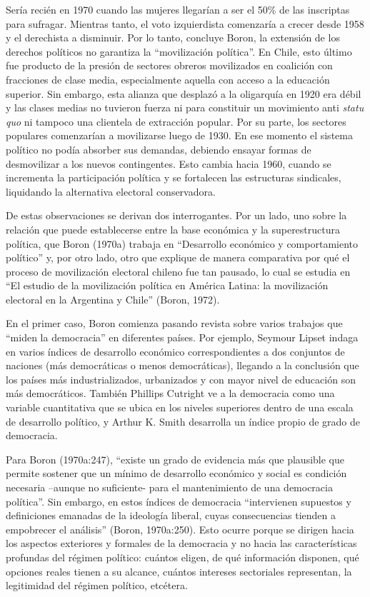Sería recién en 1970 cuando las mujeres llegarían a ser el 50\% de las inscriptas para sufragar. Mientras tanto, el voto izquierdista comenzaría a crecer desde 1958 y el derechista a disminuir. Por lo tanto, concluye Boron, la extensión de los derechos políticos no garantiza la \enquote{movilización política}. En Chile, esto último fue producto de la presión de sectores obreros movilizados en coalición con fracciones de clase media, especialmente aquella con acceso a la educación superior. Sin embargo, esta alianza que desplazó a la oligarquía en 1920 era débil y las clases medias no tuvieron fuerza ni para constituir un movimiento anti \emph{statu quo} ni tampoco una clientela de extracción popular. Por su parte, los sectores populares comenzarían a movilizarse luego de 1930. En ese momento el sistema político no podía absorber sus demandas, debiendo ensayar formas de desmovilizar a los nuevos contingentes. Esto cambia hacia 1960, cuando se incrementa la participación política y se fortalecen las estructuras sindicales, liquidando la alternativa electoral conservadora.

De estas observaciones se derivan dos interrogantes. Por un lado, uno sobre la relación que puede establecerse entre la base económica y la superestructura política, que Boron (1970a) trabaja en \enquote{Desarrollo económico y comportamiento político} y, por otro lado, otro que explique de manera comparativa por qué el proceso de movilización electoral chileno fue tan pausado, lo cual se estudia en \enquote{El estudio de la movilización política en América Latina: la movilización electoral en la Argentina y Chile} (Boron, 1972).

En el primer caso, Boron comienza pasando revista sobre varios trabajos que \enquote{miden la democracia} en diferentes países. Por ejemplo, Seymour Lipset indaga en varios índices de desarrollo económico correspondientes a dos conjuntos de naciones (más democráticas o menos democráticas), llegando a la conclusión que los países más industrializados, urbanizados y con mayor nivel de educación son más democráticos. También Phillips Cutright ve a la democracia como una variable cuantitativa que se ubica en los niveles superiores dentro de una escala de desarrollo político, y Arthur K. Smith desarrolla un índice propio de grado de democracia.

Para Boron (1970a:247), \enquote{existe un grado de evidencia más que plausible que permite sostener que un mínimo de desarrollo económico y social es condición necesaria --aunque no suficiente- para el mantenimiento de una democracia política}. Sin embargo, en estos índices de democracia \enquote{intervienen supuestos y definiciones emanadas de la ideología liberal, cuyas consecuencias tienden a empobrecer el análisis} (Boron, 1970a:250). Esto ocurre porque se dirigen hacia los aspectos exteriores y formales de la democracia y no hacia las características profundas del régimen político: cuántos eligen, de qué información disponen, qué opciones reales tienen a su alcance, cuántos intereses sectoriales representan, la legitimidad del régimen político, etcétera.

